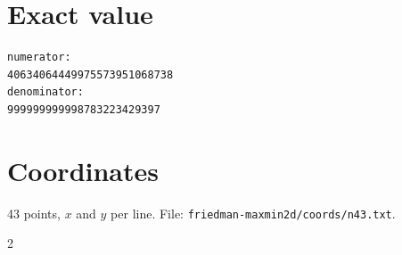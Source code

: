 \documentclass[11pt,a4paper]{article}
\begin{document}
\appendix
\section{Exact value}
{\small
\begin{verbatim}
numerator:
40634064449975573951068738
denominator:
999999999998783223429397
\end{verbatim}}

\section{Coordinates}
43 points, $x$ and $y$ per line. File: \texttt{friedman-maxmin2d/coords/n43.txt}.
{\tiny
\begin{multicols}{2}
\end{multicols}}
\end{document}
